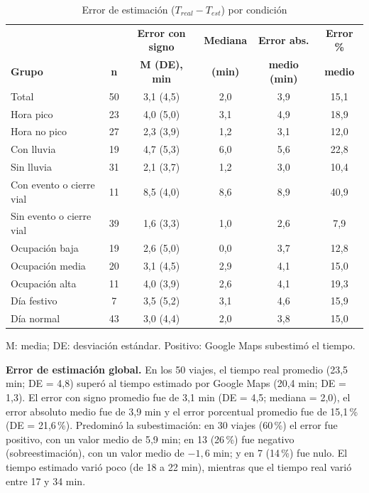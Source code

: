 \begin{table}[H]
\centering
\caption{Error de estimación ($T_{real} - T_{est}$) por condición}
\label{tab:error}
\small
\begin{tabular}{@{}l c c c c c@{}}
\toprule
 & & \textbf{Error con signo} & \textbf{Mediana} & \textbf{Error abs.} & \textbf{Error \%} \\
\textbf{Grupo} & \textbf{n} & \textbf{M (DE), min} & \textbf{(min)} & \textbf{medio (min)} & \textbf{medio} \\
\midrule
Total & 50 & 3,1 (4,5) & 2,0 & 3,9 & 15,1 \\
\midrule
Hora pico & 23 & 4,0 (5,0) & 3,1 & 4,9 & 18,9 \\
Hora no pico & 27 & 2,3 (3,9) & 1,2 & 3,1 & 12,0 \\
\midrule
Con lluvia & 19 & 4,7 (5,3) & 6,0 & 5,6 & 22,8 \\
Sin lluvia & 31 & 2,1 (3,7) & 1,2 & 3,0 & 10,4 \\
\midrule
Con evento o cierre vial & 11 & 8,5 (4,0) & 8,6 & 8,9 & 40,9 \\
Sin evento o cierre vial & 39 & 1,6 (3,3) & 1,0 & 2,6 & 7,9 \\
\midrule
Ocupación baja & 19 & 2,6 (5,0) & 0,0 & 3,7 & 12,8 \\
Ocupación media & 20 & 3,1 (4,5) & 2,9 & 4,1 & 15,0 \\
Ocupación alta & 11 & 4,0 (3,9) & 2,6 & 4,1 & 19,3 \\
\midrule
Día festivo & 7 & 3,5 (5,2) & 3,1 & 4,6 & 15,9 \\
Día normal & 43 & 3,0 (4,4) & 2,0 & 3,8 & 15,0 \\
\bottomrule
\end{tabular}

\vspace{2pt}
\footnotesize{M: media; DE: desviación estándar. Positivo: Google Maps subestimó el tiempo.}
\end{table}

\textbf{Error de estimación global.} En los 50 viajes, el tiempo real promedio (23,5 min; DE = 4,8) superó al tiempo estimado por Google Maps (20,4 min; DE = 1,3). El error con signo promedio fue de 3,1 min (DE = 4,5; mediana = 2,0), el error absoluto medio fue de 3,9 min y el error porcentual promedio fue de 15,1\,\% (DE = 21,6\,\%). Predominó la subestimación: en 30 viajes (60\,\%) el error fue positivo, con un valor medio de 5,9 min; en 13 (26\,\%) fue negativo (sobreestimación), con un valor medio de $-1{,}6$ min; y en 7 (14\,\%) fue nulo. El tiempo estimado varió poco (de 18 a 22 min), mientras que el tiempo real varió entre 17 y 34 min.

